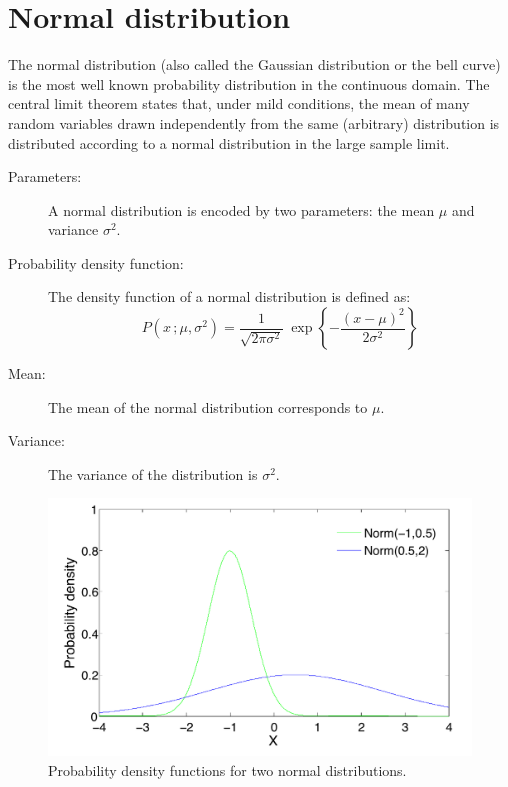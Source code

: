 \section*{Normal distribution}

The normal distribution (also called the Gaussian distribution or the bell curve) is the most well known probability distribution in the continuous domain. The central limit theorem states that, under mild conditions, the mean of many random variables drawn independently from the same (arbitrary) distribution is distributed according to a normal distribution in the large sample limit.   


\begin{description}
\item [Parameters: ] A normal distribution is encoded by two parameters: the mean $\mu$ and  variance $\sigma^2$. 

\item [Probability density function: ] The density function of a normal distribution is defined as:
\begin{equation}
P(x \,; \mu,\sigma^2) = \frac{1}{\sqrt{2\pi\sigma^2}}\ \operatorname{exp}\left\{-\frac{\left(x-\mu\right)^2}{2\sigma^2}\right\}
\end{equation}
\item [Mean: ] The mean of the normal distribution corresponds to $\mu$.

\item [Variance: ] The variance of the distribution is $\sigma^2$.

\end{description}

\begin{figure}[h!]
\centering
\includegraphics[scale=0.40]{imgs/norm_appendix.pdf}
\caption{Probability density functions for two normal distributions.} 
\label{fig:norm-appendix}
\end{figure}


